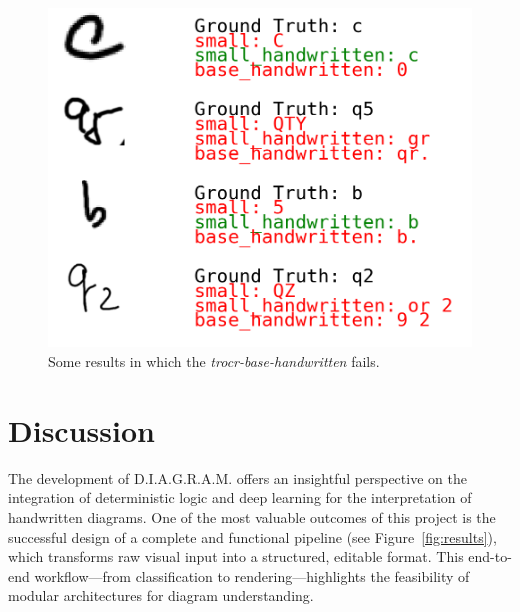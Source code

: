 \documentclass[conference]{IEEEtran}
\begin{document}
\begin{figure}[H]
\centering
\includegraphics[width=\linewidth]{text_digitization_results_2.png}
\caption{Some results in which the \textit{trocr-base-handwritten} fails.}
\label{fig:text_digitization_results_2}
\end{figure}

\section{Discussion}

The development of D.I.A.G.R.A.M. offers an insightful perspective on the integration of deterministic logic and deep learning for the interpretation of handwritten diagrams. One of the most valuable outcomes of this project is the successful design of a complete and functional pipeline (see Figure~\ref{fig:results}), which transforms raw visual input into a structured, editable format. This end-to-end workflow—from classification to rendering—highlights the feasibility of modular architectures for diagram understanding.
\end{document}
